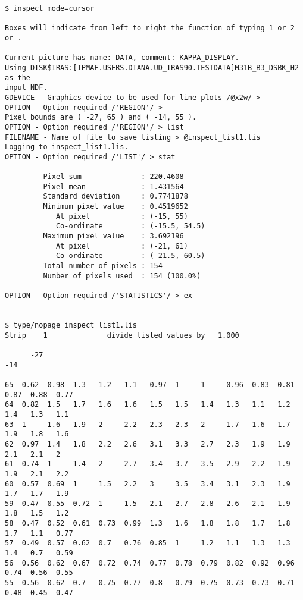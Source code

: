 \documentclass[twoside,11pt]{article}
\begin{document}
\begin{small}
\begin{verbatim}
$ inspect mode=cursor

Boxes will indicate from left to right the function of typing 1 or 2 or .

Current picture has name: DATA, comment: KAPPA_DISPLAY.
Using DISK$IRAS:[IPMAF.USERS.DIANA.UD_IRAS90.TESTDATA]M31B_B3_DSBK_H2 as the
input NDF.
GDEVICE - Graphics device to be used for line plots /@x2w/ > 
OPTION - Option required /'REGION'/ > 
Pixel bounds are ( -27, 65 ) and ( -14, 55 ).
OPTION - Option required /'REGION'/ > list
FILENAME - Name of file to save listing > @inspect_list1.lis
Logging to inspect_list1.lis.
OPTION - Option required /'LIST'/ > stat

         Pixel sum              : 220.4608
         Pixel mean             : 1.431564
         Standard deviation     : 0.7741878
         Minimum pixel value    : 0.4519652
            At pixel            : (-15, 55)
            Co-ordinate         : (-15.5, 54.5)
         Maximum pixel value    : 3.692196
            At pixel            : (-21, 61)
            Co-ordinate         : (-21.5, 60.5)
         Total number of pixels : 154
         Number of pixels used  : 154 (100.0%)

OPTION - Option required /'STATISTICS'/ > ex


$ type/nopage inspect_list1.lis
Strip    1              divide listed values by   1.000  
                                                                             
      -27                                                                         -14            
                                                                 
65  0.62  0.98  1.3   1.2   1.1   0.97  1     1     0.96  0.83  0.81  0.87  0.88  0.77            
64  0.82  1.5   1.7   1.6   1.6   1.5   1.5   1.4   1.3   1.1   1.2   1.4   1.3   1.1             
63  1     1.6   1.9   2     2.2   2.3   2.3   2     1.7   1.6   1.7   1.9   1.8   1.6             
62  0.97  1.4   1.8   2.2   2.6   3.1   3.3   2.7   2.3   1.9   1.9   2.1   2.1   2               
61  0.74  1     1.4   2     2.7   3.4   3.7   3.5   2.9   2.2   1.9   1.9   2.1   2.2             
60  0.57  0.69  1     1.5   2.2   3     3.5   3.4   3.1   2.3   1.9   1.7   1.7   1.9             
59  0.47  0.55  0.72  1     1.5   2.1   2.7   2.8   2.6   2.1   1.9   1.8   1.5   1.2             
58  0.47  0.52  0.61  0.73  0.99  1.3   1.6   1.8   1.8   1.7   1.8   1.7   1.1   0.77            
57  0.49  0.57  0.62  0.7   0.76  0.85  1     1.2   1.1   1.3   1.3   1.4   0.7   0.59            
56  0.56  0.62  0.67  0.72  0.74  0.77  0.78  0.79  0.82  0.92  0.96  0.74  0.56  0.55            
55  0.56  0.62  0.7   0.75  0.77  0.8   0.79  0.75  0.73  0.73  0.71  0.48  0.45  0.47            
\end{verbatim}
\end{small}
\end{document}
